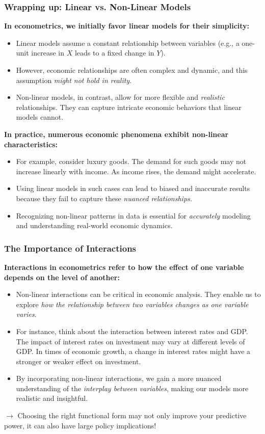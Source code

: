 \documentclass[notes,10pt, aspectratio=169]{beamer}
\begin{document}
\begin{frame}
\frametitle{Wrapping up: Linear vs. Non-Linear Models}

\textbf{In econometrics, we initially favor linear models for their simplicity:}
\begin{itemize}
    \item Linear models assume a constant relationship between variables (e.g., a one-unit increase in $X$ leads to a fixed change in $Y$).
    \item However, economic relationships are often complex and dynamic, and this assumption \textit{might not hold in reality}.
    \item Non-linear models, in contrast, allow for more flexible and \textit{realistic} relationships. They can capture intricate economic behaviors that linear models cannot.
\end{itemize}
\vspace{1em}
\textbf{In practice, numerous economic phenomena exhibit non-linear characteristics:}
\begin{itemize}
    \item For example, consider luxury goods. The demand for such goods may not increase linearly with income. As income rises, the demand might accelerate.
    \item Using linear models in such cases can lead to biased and inaccurate results because they fail to capture these \textit{nuanced relationships.}
    \item Recognizing non-linear patterns in data is essential for \textit{accurately} modeling and understanding real-world economic dynamics.
\end{itemize}

\end{frame}




\begin{frame}
\frametitle{The Importance of Interactions}

\textbf{Interactions in econometrics refer to how the effect of one variable depends on the level of another:}
\begin{itemize}
    \item Non-linear interactions can be critical in economic analysis. They enable us to explore \textit{how the relationship between two variables changes as one variable varies}.
    \item For instance, think about the interaction between interest rates and GDP. The impact of interest rates on investment may vary at different levels of GDP. In times of economic growth, a change in interest rates might have a stronger or weaker effect on investment.
    \item By incorporating non-linear interactions, we gain a more nuanced understanding of the \textit{interplay between variables}, making our models more realistic and insightful.
\end{itemize}
\vspace{1em}
$\longrightarrow$ Choosing the right functional form may not only improve your predictive power, it can also have large policy implications!
\end{frame}
\end{document}
